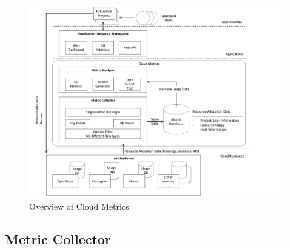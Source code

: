 \documentclass{sig-alternate}
\begin{document}
\begin{figure}[h!] 
  \centering 
    \includegraphics[width=1.0\columnwidth]{images/system_overview.pdf} 
  \caption{Overview of Cloud Metrics}\label{F:fig7} 
\end{figure} 


\subsection{Metric Collector}
\end{document}
